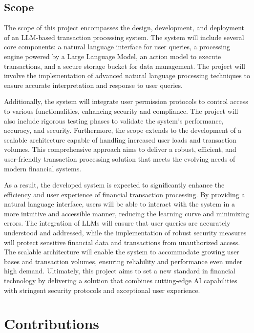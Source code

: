\subsection{Scope}

The scope of this project encompasses the design, development, and deployment of an LLM-based transaction processing system. The system will include several core components: a natural language interface for user queries, a processing engine powered by a Large Language Model, an action model to execute transactions, and a secure storage bucket for data management. The project will involve the implementation of advanced natural language processing techniques to ensure accurate interpretation and response to user queries.

\noindent Additionally, the system will integrate user permission protocols to control access to various functionalities, enhancing security and compliance. The project will also include rigorous testing phases to validate the system's performance, accuracy, and security. Furthermore, the scope extends to the development of a scalable architecture capable of handling increased user loads and transaction volumes. This comprehensive approach aims to deliver a robust, efficient, and user-friendly transaction processing solution that meets the evolving needs of modern financial systems.

\clearpage

\noindent As a result, the developed system is expected to significantly enhance the efficiency and user experience of financial transaction processing. By providing a natural language interface, users will be able to interact with the system in a more intuitive and accessible manner, reducing the learning curve and minimizing errors. The integration of LLMs will ensure that user queries are accurately understood and addressed, while the implementation of robust security measures will protect sensitive financial data and transactions from unauthorized access. The scalable architecture will enable the system to accommodate growing user bases and transaction volumes, ensuring reliability and performance even under high demand. Ultimately, this project aims to set a new standard in financial technology by delivering a solution that combines cutting-edge AI capabilities with stringent security protocols and exceptional user experience.

\section{Contributions}

